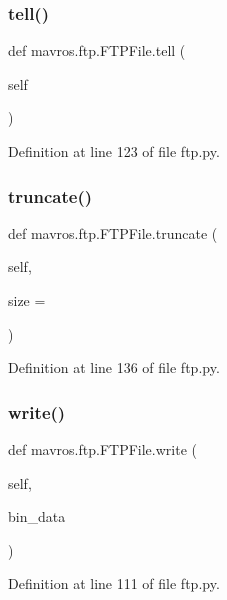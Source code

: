 \subsubsection{\texorpdfstring{tell()}{tell()}}
{\footnotesize\ttfamily def mavros.\+ftp.\+F\+T\+P\+File.\+tell (\begin{DoxyParamCaption}\item[{}]{self }\end{DoxyParamCaption})}



Definition at line 123 of file ftp.\+py.

\mbox{\label{classmavros_1_1ftp_1_1FTPFile_a7d31a3943fa085489ad4c688c3870a10}} 
\subsubsection{\texorpdfstring{truncate()}{truncate()}}
{\footnotesize\ttfamily def mavros.\+ftp.\+F\+T\+P\+File.\+truncate (\begin{DoxyParamCaption}\item[{}]{self,  }\item[{}]{size = {} }\end{DoxyParamCaption})}



Definition at line 136 of file ftp.\+py.

\mbox{\label{classmavros_1_1ftp_1_1FTPFile_aa1878b3e0aa7d10f58b443ad4e6351ce}} 
\subsubsection{\texorpdfstring{write()}{write()}}
{\footnotesize\ttfamily def mavros.\+ftp.\+F\+T\+P\+File.\+write (\begin{DoxyParamCaption}\item[{}]{self,  }\item[{}]{bin\+\_\+data }\end{DoxyParamCaption})}



Definition at line 111 of file ftp.\+py.



